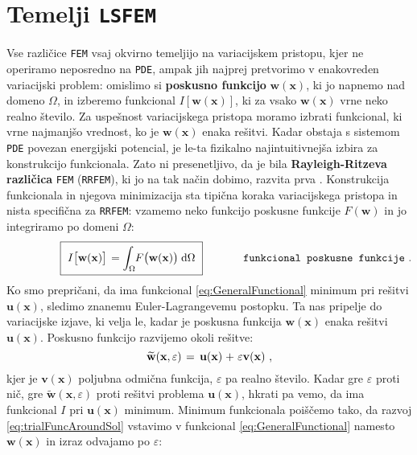 \section{Temelji \texttt{LSFEM}}

Vse različice \texttt{FEM} vsaj okvirno temeljijo na variacijskem pristopu, kjer ne operiramo neposredno na \texttt{PDE}, ampak jih najprej pretvorimo v enakovreden variacijski problem: omislimo si \textbf{poskusno funkcijo} $\mathbf{w}(\mathbf{x})$, ki jo napnemo nad domeno $\Omega$, in izberemo funkcional $I[\mathbf{w}(\mathbf{x})]$, ki za vsako $\mathbf{w}(\mathbf{x})$ vrne neko realno število. Za uspešnost variacijskega pristopa moramo izbrati funkcional, ki vrne najmanjšo vrednost, ko je $\mathbf{w}(\mathbf{x})$ enaka rešitvi. Kadar obstaja s sistemom \texttt{PDE} povezan energijski potencial, je le-ta fizikalno najintuitivnejša izbira za konstrukcijo funkcionala. Zato ni presenetljivo, da je bila \textbf{Rayleigh-Ritzeva različica} \texttt{FEM} (\texttt{RRFEM}), ki jo na tak način dobimo, razvita prva \cite{RitzW-Variationsprobleme}. Konstrukcija funkcionala in njegova minimizacija sta tipična koraka variacijskega pristopa in nista specifična za \texttt{RRFEM}: vzamemo neko funkcijo poskusne funkcije $F\left(\mathbf{w}\right)$ in jo integriramo po domeni $\Omega$:
\vspace{-1mm}
\begin{equation}
	\hspace{17mm}
	\boxed{
		\vphantom{\bigg(} \ I\big[\mathbf{w(x)}\big]\mkern2mu
		=
		\int_{\Omega} \mkern-4mu F\big(\mathbf{w(x)}\big) \mkern5mu \ud \Omega \ 
	}
	\hspace{13mm} \texttt{funkcional poskusne funkcije} \ .
	\label{eq:GeneralFunctional}
\end{equation}
Ko smo prepričani, da ima funkcional \eqref{eq:GeneralFunctional} minimum pri rešitvi $\mathbf{u}(\mathbf{x})$, sledimo znanemu Euler-Lagrange\-ve\-mu postopku. Ta nas pripelje do variacijske izjave, ki velja le, kadar je poskusna funkcija $\mathbf{w}(\mathbf{x})$ enaka rešitvi $\mathbf{u}(\mathbf{x})$. Poskusno funkcijo razvijemo okoli rešitve:
\begin{equation}
	\widetilde{\mathbf{w}}(\mathbf{x}, \varepsilon) \mkern2mu
	=
	\, \mathbf{u}(\mathbf{x}) \mkern1mu + \mkern1.5mu \varepsilon \mathbf{v}(\mathbf{x}) \ ,
	\label{eq:trialFuncAroundSol}
\end{equation}
kjer je $\mathbf{v}(\mathbf{x})$ poljubna odmična funkcija, $\varepsilon$ pa realno število. Kadar gre $\varepsilon$ proti nič, gre $\widetilde{\mathbf{w}}(\mathbf{x}, \varepsilon)$ proti rešitvi problema $\mathbf{u}(\mathbf{x})$, hkrati pa vemo, da ima funkcional $I$ pri $\mathbf{u}(\mathbf{x})$ minimum. Minimum funkcionala poiščemo tako, da razvoj \eqref{eq:trialFuncAroundSol} vstavimo v funkcional \eqref{eq:GeneralFunctional} namesto $\mathbf{w}(\mathbf{x})$ in izraz odvajamo po $\varepsilon$:
